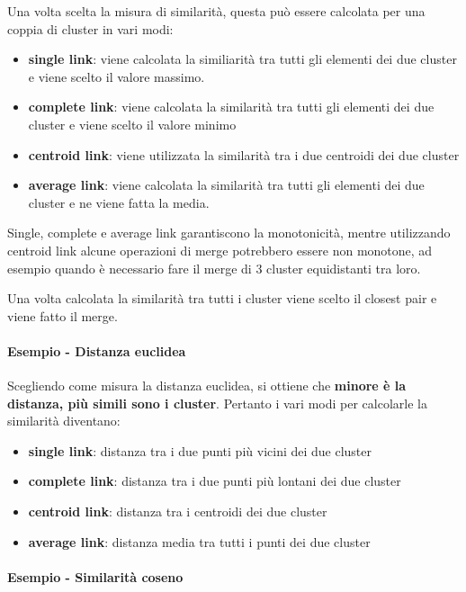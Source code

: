Una volta scelta la misura di similarità, questa può essere calcolata per una coppia di cluster in vari modi:

\begin{itemize}
\item
  \textbf{single link}: viene calcolata la similiarità tra tutti gli elementi dei due cluster e viene scelto il valore massimo.
\item
  \textbf{complete link}: viene calcolata la similarità tra tutti gli elementi dei due cluster e viene scelto il valore minimo
\item
  \textbf{centroid link}: viene utilizzata la similarità tra i due centroidi dei due cluster
\item
  \textbf{average link}: viene calcolata la similarità tra tutti gli elementi dei due cluster e ne viene fatta la media.
\end{itemize}

Single, complete e average link garantiscono la monotonicità, mentre utilizzando centroid link alcune operazioni di merge potrebbero essere non monotone, ad esempio quando è necessario fare il merge di 3 cluster equidistanti tra loro.

Una volta calcolata la similarità tra tutti i cluster viene scelto il closest pair e viene fatto il merge.

\paragraph{Esempio - Distanza euclidea}

Scegliendo come misura la distanza euclidea, si ottiene che \textbf{minore è la distanza, più simili sono i cluster}. Pertanto i vari modi per calcolarle la similarità diventano:

\begin{itemize}
	\item
	\textbf{single link}: distanza tra i due punti più vicini dei due cluster
	\item
	\textbf{complete link}: distanza tra i due punti più lontani dei due cluster
	\item
	\textbf{centroid link}: distanza tra i centroidi dei due cluster
	\item
	\textbf{average link}: distanza media tra tutti i punti dei due cluster
\end{itemize}

\paragraph{Esempio - Similarità coseno}

